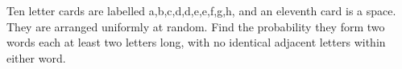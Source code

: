 Ten letter cards are labelled a,b,c,d,d,e,e,f,g,h, and an eleventh card is a space. They are arranged uniformly at random. Find the probability they form two words each at least two letters long, with no identical adjacent letters within either word.
